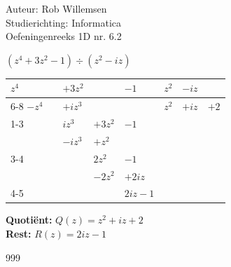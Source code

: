 \documentclass[a4paper]{article}
\begin{document}
\noindent \large Auteur: Rob Willemsen \\
\noindent \large Studierichting: Informatica\\
\noindent \large Oefeningenreeks 1D nr. 6.2\\

\medskip

\normalsize

$(z^4 + 3z^2 - 1) \div (z^2 - iz)$ \\

\begin{tabular}{lllll|lll}
$z^4$ & & $+3z^2$ & & $-1$ & $z^2$ & $-iz$ & \\ \cline{6-8}
$-z^4$ & & $+iz^3$ & & & $z^2$ & $+iz$ & $+2$ \\ \cline{1-3}
& & $iz^3$ & $+3z^2$ & $-1$ & & & \\
& & $-iz^3$ & $+z^2$ & & & & \\ \cline{3-4}
& & & $2z^2$ & $-1$ & & & \\
& & & $-2z^2$ & $+2iz$ & & & \\ \cline{4-5}
& & & & $2iz-1$ & & & 
\end{tabular}

\textbf{Quotiënt:} $Q(z) = z^2 + iz + 2$ \\

\textbf{Rest:} $R(z) = 2iz - 1$ \\

\begin{thebibliography}{999}
\end{thebibliography}
\end{document}
